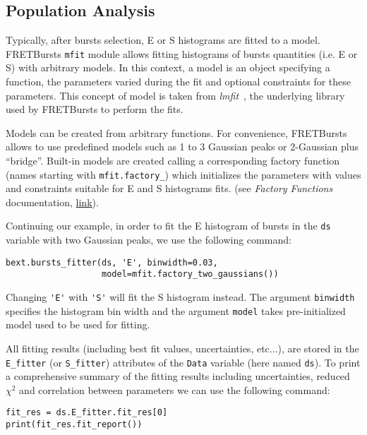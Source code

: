 \subsection{Population Analysis}
\label{sec:fretfit}

Typically, after bursts selection, E or S histograms are fitted to a model.
FRETBursts \verb|mfit| module allows fitting histograms of bursts quantities
(i.e. E or S) with arbitrary models. In this context, a model is an object
specifying a function, the parameters varied during the fit
and optional constraints for these parameters. This concept of model
is taken from \textit{lmfit}~\cite{lmfit}, the underlying library used by
FRETBursts to perform the fits.

Models can be created from arbitrary functions. For convenience,
FRETBursts allows to use predefined models such as 1 to 3 Gaussian
peaks or 2-Gaussian plus ``bridge''.
Built-in models are created calling a corresponding factory function
(names starting with \verb|mfit.factory_|) which initializes the parameters
with values and constraints suitable for E and S histograms fits.
(see \textit{Factory Functions} documentation,
\href{http://fretbursts.readthedocs.org/en/latest/mfit.html#model-factory-functions}{link}).

Continuing our example, in order to fit the E histogram of bursts in the
\verb|ds| variable with two Gaussian peaks, we use the following command:

\begin{lstlisting}
bext.bursts_fitter(ds, 'E', binwidth=0.03,
                   model=mfit.factory_two_gaussians())
\end{lstlisting}

Changing \verb|'E'| with \verb|'S'| will fit the S histogram instead.
The argument \verb|binwidth| specifies the histogram bin width and
the argument \verb|model| takes pre-initialized model used to be used for
fitting.

All fitting results (including best fit values, uncertainties, etc...),
are stored in the \verb|E_fitter| (or \verb|S_fitter|)
attributes of the \verb|Data| variable (here named \verb|ds|).
To print a comprehensive summary of the fitting results including
uncertainties, reduced $\chi^2$ and correlation between parameters
we can use the following command:

\begin{lstlisting}
fit_res = ds.E_fitter.fit_res[0]
print(fit_res.fit_report())
\end{lstlisting}

